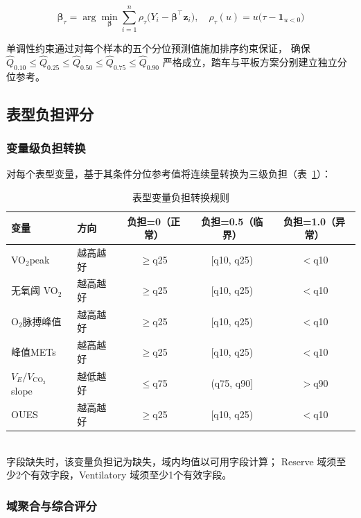 \documentclass[12pt, a4paper]{ctexart}
\begin{document}
\begin{equation}
\label{eq:pinball}
\hat{\boldsymbol{\beta}}_\tau = \arg\min_{\boldsymbol{\beta}}
\sum_{i=1}^{n} \rho_\tau\bigl(Y_i - \boldsymbol{\beta}^\top \mathbf{z}_i\bigr),
\quad \rho_\tau(u) = u\bigl(\tau - \mathbf{1}_{u < 0}\bigr)
\end{equation}

单调性约束通过对每个样本的五个分位预测值施加排序约束保证，
确保 $\hat{Q}_{0.10} \leq \hat{Q}_{0.25} \leq \hat{Q}_{0.50}
\leq \hat{Q}_{0.75} \leq \hat{Q}_{0.90}$ 严格成立，踏车与平板方案分别建立独立分位参考。

\subsection{表型负担评分}

\subsubsection{变量级负担转换}

对每个表型变量，基于其条件分位参考值将连续量转换为三级负担（表~\ref{tab:burden_rules}）：

\begin{table}[htbp]
\centering
\small
\caption{表型变量负担转换规则}
\label{tab:burden_rules}
\begin{tabular}{llccc}
\toprule
变量 & 方向 & 负担=0（正常）& 负担=0.5（临界）& 负担=1.0（异常）\\
\midrule
VO$_2$peak & 越高越好 & $\geq$q25 & [q10, q25) & $<$q10 \\
无氧阈 VO$_2$ & 越高越好 & $\geq$q25 & [q10, q25) & $<$q10 \\
O$_2$脉搏峰值 & 越高越好 & $\geq$q25 & [q10, q25) & $<$q10 \\
峰值METs & 越高越好 & $\geq$q25 & [q10, q25) & $<$q10 \\
$V_E/V_{\text{CO}_2}$ slope & 越低越好 & $\leq$q75 & (q75, q90] & $>$q90 \\
OUES & 越高越好 & $\geq$q25 & [q10, q25) & $<$q10 \\
\bottomrule
\end{tabular}
\\[1ex]
{\footnotesize 字段缺失时，该变量负担记为缺失，域内均值以可用字段计算；
Reserve 域须至少2个有效字段，Ventilatory 域须至少1个有效字段。}
\end{table}

\subsubsection{域聚合与综合评分}
\end{document}
